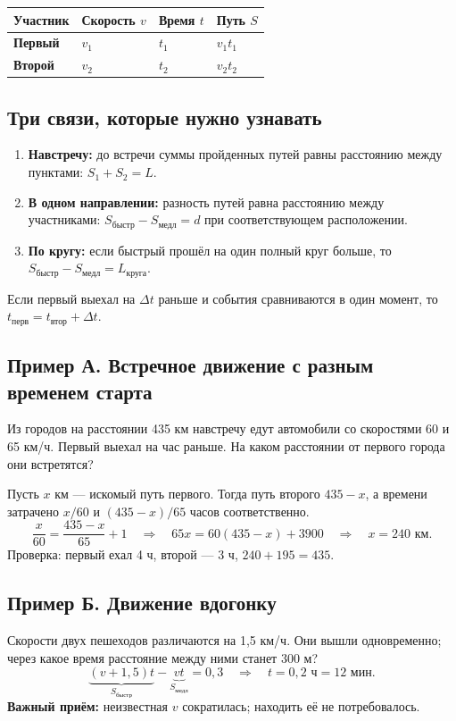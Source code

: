 \documentclass[a4paper,12pt]{article}
\newcommand{\key}[1]{\textcolor{darkaccent}{\bfseries #1}}
\begin{document}
\begin{center}
\renewcommand{\arraystretch}{1.4}
\begin{tabularx}{0.92\linewidth}{>{\bfseries}lXXX}
\toprule
Участник & Скорость \(v\) & Время \(t\) & Путь \(S\)\\
\midrule
Первый & \(v_1\) & \(t_1\) & \(v_1t_1\)\\
Второй & \(v_2\) & \(t_2\) & \(v_2t_2\)\\
\bottomrule
\end{tabularx}
\end{center}

\subsection*{Три связи, которые нужно узнавать}
\begin{enumerate}[label=\textcolor{accent}{\arabic*.}]
\item \key{Навстречу:} до встречи суммы пройденных путей равны расстоянию между пунктами: \(S_1+S_2=L\).
\item \key{В одном направлении:} разность путей равна расстоянию между участниками: \(S_{\text{быстр}}-S_{\text{медл}}=d\) при соответствующем расположении.
\item \key{По кругу:} если быстрый прошёл на один полный круг больше, то \(S_{\text{быстр}}-S_{\text{медл}}=L_{\text{круга}}\).
\end{enumerate}
Если первый выехал на \(\Delta t\) раньше и события сравниваются в один момент, то \(t_{\text{перв}}=t_{\text{втор}}+\Delta t\).

\subsection*{Пример А. Встречное движение с разным временем старта}
Из городов на расстоянии 435 км навстречу едут автомобили со скоростями 60 и 65 км/ч. Первый выехал на час раньше. На каком расстоянии от первого города они встретятся?

Пусть \(x\) км — искомый путь первого. Тогда путь второго \(435-x\), а времени затрачено \(x/60\) и \((435-x)/65\) часов соответственно.
\[
 \frac{x}{60}=\frac{435-x}{65}+1
 \quad\Longrightarrow\quad 65x=60(435-x)+3900
 \quad\Longrightarrow\quad \boxed{x=240\text{ км}}.
\]
Проверка: первый ехал 4 ч, второй — 3 ч, \(240+195=435\).

\subsection*{Пример Б. Движение вдогонку}
Скорости двух пешеходов различаются на 1,5 км/ч. Они вышли одновременно; через какое время расстояние между ними станет 300 м?
\[
 \underbrace{(v+1{,}5)t}_{S_{\text{быстр}}}-\underbrace{vt}_{S_{\text{медл}}}
 =0{,}3\quad\Longrightarrow\quad t=0{,}2\text{ ч}=\boxed{12\text{ мин}}.
\]
\key{Важный приём:} неизвестная \(v\) сократилась; находить её не потребовалось.
\end{document}
